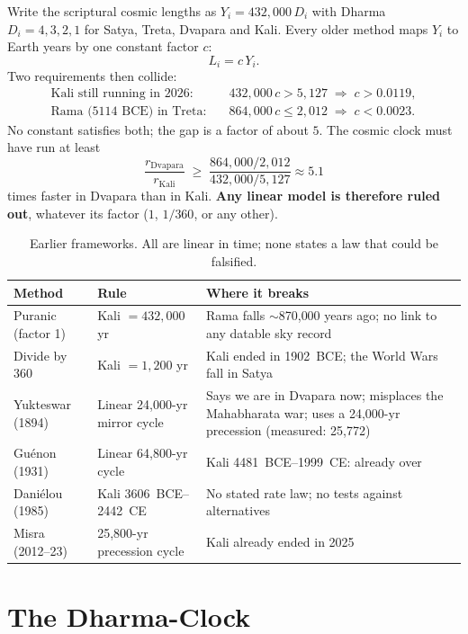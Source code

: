 \documentclass[11pt,a4paper]{article}
\begin{document}
Write the scriptural cosmic lengths as $Y_i = 432{,}000\,D_i$ with Dharma $D_i = 4,3,2,1$ for Satya, Treta, Dvapara and Kali. Every older method maps $Y_i$ to Earth years by one constant factor $c$:
\begin{equation}
L_i = c\,Y_i .
\end{equation}
Two requirements then collide:
\begin{align}
\text{Kali still running in 2026:}\quad & 432{,}000\,c > 5{,}127 \;\Rightarrow\; c > 0.0119,\\
\text{Rama (5114 BCE) in Treta:}\quad & 864{,}000\,c \le 2{,}012 \;\Rightarrow\; c < 0.0023.
\end{align}
No constant satisfies both; the gap is a factor of about $5$. The cosmic clock must have run at least
\begin{equation}
\frac{r_{\text{Dvapara}}}{r_{\text{Kali}}} \;\ge\; \frac{864{,}000/2{,}012}{432{,}000/5{,}127} \approx 5.1
\end{equation}
times faster in Dvapara than in Kali. \textbf{Any linear model is therefore ruled out}, whatever its factor ($1$, $1/360$, or any other).

\begin{table}[H]
\centering
\small
\begin{tabularx}{\textwidth}{@{}lXX@{}}
\toprule
Method & Rule & Where it breaks \\
\midrule
Puranic (factor 1) & Kali $= 432{,}000$ yr & Rama falls $\sim$870{,}000 years ago; no link to any datable sky record \\
Divide by 360 & Kali $= 1{,}200$ yr & Kali ended in 1902~BCE; the World Wars fall in Satya \\
Yukteswar (1894) & Linear 24{,}000-yr mirror cycle & Says we are in Dvapara now; misplaces the Mahabharata war; uses a 24{,}000-yr precession (measured: 25{,}772) \\
Gu\'enon (1931) & Linear 64{,}800-yr cycle & Kali 4481~BCE--1999~CE: already over \\
Dani\'elou (1985) & Kali 3606~BCE--2442~CE & No stated rate law; no tests against alternatives \\
Misra (2012--23) & 25{,}800-yr precession cycle & Kali already ended in 2025 \\
\bottomrule
\end{tabularx}
\caption{Earlier frameworks. All are linear in time; none states a law that could be falsified.}
\end{table}

\section{The Dharma-Clock}
\end{document}
